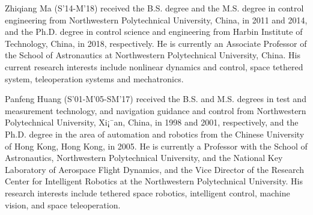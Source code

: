 \documentclass[10pt,final,journal]{IEEEtran}
\begin{document}
\begin{IEEEbiography}{Zhiqiang Ma (S'14-M'18)}
	 received the B.S. degree and the M.S. degree in control engineering from Northwestern Polytechnical University, China, in 2011 and 2014, and the Ph.D. degree in control science and engineering from Harbin Institute of Technology, China, in 2018, respectively. He is currently an Associate Professor of the School of Astronautics at Northwestern Polytechnical University, China. His current research interests include nonlinear dynamics and control, space tethered system, teleoperation systems and mechatronics.
	
	\end{IEEEbiography}
\begin{IEEEbiography}{Panfeng Huang (S'01-M'05-SM'17)}
 received the B.S. and M.S. degrees in test and measurement technology, and navigation guidance and control from Northwestern Polytechnical University, Xi¡¯an, China, in 1998 and 2001, respectively, and the Ph.D. degree in the area of automation and robotics from the Chinese University of Hong Kong, Hong Kong, in 2005. He is currently a Professor with the School of Astronautics, Northwestern Polytechnical University, and the National Key Laboratory of Aerospace Flight Dynamics, and the Vice Director of the Research Center for Intelligent Robotics at the Northwestern Polytechnical University. His research interests include tethered space robotics, intelligent control, machine vision, and space teleoperation.

\end{IEEEbiography}






\end{document}
